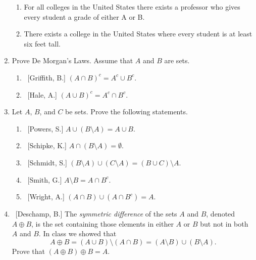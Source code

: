 \documentclass[10pt]{article}
\begin{document}
\begin{enumerate}
\begin{enumerate}
	\item  For all colleges in the United States there exists a professor who gives every student a grade of either A or B.
	
	\item  There exists a college in the United States where every student is at least six feet tall.
	
	\end{enumerate}

\item\label{prob:DeMorgan}  Prove De Morgan's Laws.  Assume that $A$ and $B$ are sets.

	\begin{enumerate}
	
	\item  ~[Griffith, B.] $\left( A \cap B \right)^{c} = A^{c} \cup B^{c}$.
	
	\item  ~[Hale, A.] $\left( A \cup B \right)^{c} = A^{c} \cap B^{c}$.
	
	\end{enumerate}
	
\item\label{prob:identities}  Let $A$, $B$, and $C$ be sets.  Prove the following statements.

	\begin{enumerate}
	
	\item  ~[Powers, S.] $A \cup (B \setminus A) = A \cup B$.
	
	\item  ~[Schipke, K.] $A \cap (B \setminus A) = \emptyset$.
	
	\item  ~[Schmidt, S.] $(B \setminus A) \cup (C \setminus A) = (B \cup C) \setminus A$.
	
	\item  ~[Smith, G.] $A \setminus B = A \cap B^c$.
	
	\item  ~[Wright, A.] $(A \cap B) \cup (A \cap B^c) = A$.
	
	\end{enumerate}
	
\item\label{prob:sym_diff}  ~[Deschamp, B.] The \emph{symmetric difference} of the sets $A$ and $B$, denoted $A \oplus B$, is the set containing those elements in either $A$ or $B$ but not in both $A$ and $B$.  In class we showed that \begin{equation}\label{eq:sym_diff} A \oplus B = (A \cup B) \setminus (A \cap B) = (A \setminus B) \cup (B \setminus A).\end{equation}  Prove that $(A \oplus B) \oplus B = A$.


\end{enumerate}
\end{document}
